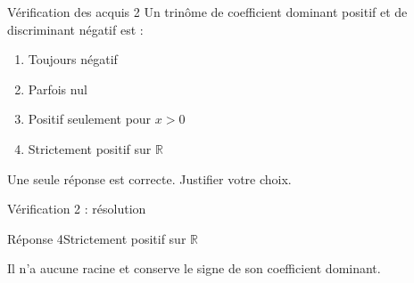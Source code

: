 \documentclass[aspectratio=169,12pt]{beamer}
\begin{document}
\renewcommand{\slidekind}{À VOUS DE JOUER}\begin{frame}[t]{Vérification des acquis 2}
Un trinôme de coefficient dominant positif et de discriminant négatif est :\begin{enumerate}
\item Toujours négatif
\item Parfois nul
\item Positif seulement pour $x>0$
\item Strictement positif sur $\mathbb R$
\end{enumerate}\medskip Une seule réponse est correcte. Justifier votre choix.\end{frame}
\renewcommand{\slidekind}{COMPRENDRE LA RÉPONSE}\begin{frame}[t]{Vérification 2 : résolution}
\begin{block}{Réponse 4}Strictement positif sur $\mathbb R$\end{block}\medskip Il n’a aucune racine et conserve le signe de son coefficient dominant.\end{frame}
\end{document}
